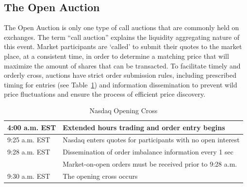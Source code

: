 \subsection{The Open Auction} 
The Open Auction is only one type of call auctions that are commonly held on exchanges. The term ``call auction'' explains the liquidity aggregating nature of this event. Market participants are `called' to submit their quotes to the market place, at a consistent time, in order to determine a matching price that will maximize the amount of shares that can be transacted. To facilitate timely and orderly cross, auctions have strict order submission rules, including prescribed timing for entries (see Table~\ref{tab:NASDAQopen}) and information dissemination to prevent wild price fluctuations and ensure the process of efficient price discovery.
        \begin{table}[!ht]
        \centering
        \caption{Nasdaq Opening Cross \label{tab:NASDAQopen}}
        \begin{tabular}{ll} 
        	4:00 a.m. EST & Extended hours trading and order entry begins  \\ \hline
        	9:25 a.m. EST & Nasdaq enters quotes for participants with no open interest \\ \hline
        	9:28 a.m. EST & Dissemination of order imbalance information every 1 sec  \\ 
        	 & Market-on-open orders must be received prior to 9:28 a.m.   \\ \hline	
        	9:30 a.m. EST & The opening cross occurs		
        \end{tabular}
        \end{table}	


